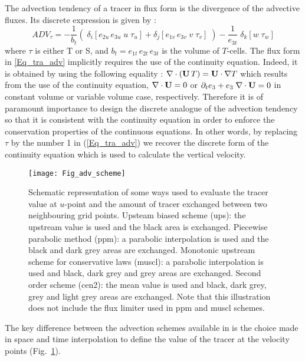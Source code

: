 \documentclass[NEMO_book]{subfiles}
\begin{document}
The advection tendency of a tracer in flux form is the divergence of the advective 
fluxes. Its discrete expression is given by :
\begin{equation} \label{Eq_tra_adv}
ADV_\tau =-\frac{1}{b_t} \left( 
\;\delta _i \left[ e_{2u}\,e_{3u} \;  u\; \tau _u  \right]
+\delta _j \left[ e_{1v}\,e_{3v}  \;  v\; \tau _v  \right] \; \right)
-\frac{1}{e_{3t}} \;\delta _k \left[ w\; \tau _w \right]
\end{equation}
where $\tau$ is either T or S, and $b_t= e_{1t}\,e_{2t}\,e_{3t}$ is the volume of $T$-cells. 
The flux form in \eqref{Eq_tra_adv} 
implicitly requires the use of the continuity equation. Indeed, it is obtained
by using the following equality : $\nabla \cdot \left( \mathbf{U}\,T \right)=\mathbf{U} \cdot \nabla T$ 
which results from the use of the continuity equation, $\nabla \cdot \mathbf{U}=0$ or 
$ \partial _t e_3 + e_3\;\nabla \cdot \mathbf{U}=0$ in constant volume or variable volume case, respectively. 
Therefore it is of paramount importance to design the discrete analogue of the 
advection tendency so that it is consistent with the continuity equation in order to 
enforce the conservation properties of the continuous equations. In other words, 
by replacing $\tau$ by the number 1 in (\ref{Eq_tra_adv}) we recover the discrete form of 
the continuity equation which is used to calculate the vertical velocity.
\begin{figure}[!t] 	 \begin{center}
\texttt{[image: Fig\_adv\_scheme]}
\caption{	\label{Fig_adv_scheme} 
Schematic representation of some ways used to evaluate the tracer value 
at $u$-point and the amount of tracer exchanged between two neighbouring grid 
points. Upsteam biased scheme (ups): the upstream value is used and the black 
area is exchanged. Piecewise parabolic method (ppm): a parabolic interpolation 
is used and the black and dark grey areas are exchanged. Monotonic upstream 
scheme for conservative laws (muscl):  a parabolic interpolation is used and black, 
dark grey and grey areas are exchanged. Second order scheme (cen2): the mean 
value is used and black, dark grey, grey and light grey areas are exchanged. Note 
that this illustration does not include the flux limiter used in ppm and muscl schemes.}
\end{center}   \end{figure}

The key difference between the advection schemes available in \NEMO is the choice 
made in space and time interpolation to define the value of the tracer at the 
velocity points (Fig.~\ref{Fig_adv_scheme}). 
\end{document}
